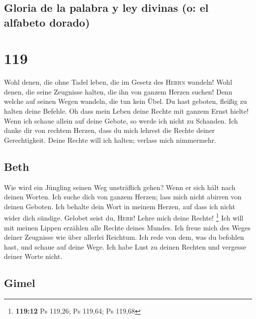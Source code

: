 \hypertarget{gloria-de-la-palabra-y-ley-divinas-o-el-alfabeto-dorado}{%
\subsection{Gloria de la palabra y ley divinas (o: el alfabeto
dorado)}\label{gloria-de-la-palabra-y-ley-divinas-o-el-alfabeto-dorado}}

\hypertarget{section-118}{%
\section{119}\label{section-118}}

 Wohl denen, die ohne Tadel leben, die im Gesetz des
\textsc{Herrn} wandeln!  Wohl denen, die seine Zeugnisse
halten, die ihn von ganzem Herzen suchen!  Denn welche auf
seinen Wegen wandeln, die tun kein Übel.  Du hast geboten,
fleißig zu halten deine Befehle.  Oh dass mein Leben deine
Rechte mit ganzem Ernst hielte!  Wenn ich schaue allein
auf deine Gebote, so werde ich nicht zu Schanden.  Ich
danke dir von rechtem Herzen, dass du mich lehrest die Rechte deiner
Gerechtigkeit.  Deine Rechte will ich halten; verlass mich
nimmermehr.

\hypertarget{beth}{%
\subsection{Beth}\label{beth}}

 Wie wird ein Jüngling seinen Weg unsträflich gehen? Wenn
er sich hält nach deinen Worten.  Ich suche dich von
ganzem Herzen; lass mich nicht abirren von deinen Geboten.
 Ich behalte dein Wort in meinem Herzen, auf dass ich
nicht wider dich sündige.  Gelobet seist du,
\textsc{Herr}! Lehre mich deine Rechte! \footnote{\textbf{119:12} Ps
  119,26; Ps 119,64; Ps 119,68}  Ich will mit meinen
Lippen erzählen alle Rechte deines Mundes.  Ich freue
mich des Weges deiner Zeugnisse wie über allerlei Reichtum.
 Ich rede von dem, was du befohlen hast, und schaue auf
deine Wege.  Ich habe Lust zu deinen Rechten und vergesse
deiner Worte nicht.

\hypertarget{gimel}{%
\subsection{Gimel}\label{gimel}}

